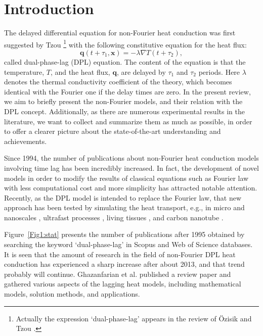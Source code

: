 \documentclass[sn-mathphys]{sn-jnl}%
\theoremstyle{thmstyleone}%
\theoremstyle{thmstyletwo}%
\theoremstyle{thmstylethree}%
\begin{document}
\section{Introduction}
{{ 
		The delayed differential equation for non-Fourier heat conduction was first suggested by Tzou \cite{Tzo95a,Tzou1995,Tzou1995p2,Tzo97b,Tzou2010,Tzoubook}\footnote{Actually the expression `dual-phase-lag' appears in the review of Özisik and Tzou \cite{OziTzu94a}.} with the following constitutive equation for the heat flux: 		
		\begin{equation}
			\mathbf{q}(t+\tau_1,\mathbf{x}) = -\lambda \nabla T(t+\tau_2),
			\label{dpl_eq}\end{equation}
			called dual-phase-lag (DPL) equation.
		The content of the equation is that the temperature, $T$, and the heat flux, $\mathbf{q}$, are delayed by $\tau_1$ and $\tau_2$ periods. Here $\lambda$ denotes the thermal conductivity coefficient of the theory, which becomes identical with the Fourier one if the delay times are zero. In the present review, we aim to briefly present the non-Fourier models, and their relation with the DPL concept. Additionally, as there are numerous experimental results in the literature, we want to collect and summarize them as much as possible, in order to offer a clearer picture about the state-of-the-art understanding and achievements. 

	
	Since 1994, the number of publications about non-Fourier heat conduction models involving time lag has been incredibly increased.  In fact, the development of novel models in order to modify the results of classical equations such as Fourier law with less computational cost and more simplicity has attracted notable attention. Recently, as the DPL model is intended to replace the Fourier law, that new approach has been tested by simulating the heat transport, e.g., in micro and nanoscales \cite{Vermeersch2008}, ultrafast processes \cite{Tzou2001,Chou2009}, living tissues \cite{Zhou2009}, and carbon nanotube \cite{Shiomi2006}.}
	 Figure~\ref{Fig1:stat} presents the number of publications after 1995 obtained by searching the keyword `dual-phase-lag' in Scopus and Web of Science databases. It is seen that the amount of research in the field of non-Fourier DPL heat conduction has experienced a sharp increase after about 2013, and that trend probably will continue. Ghazanfarian et al. \cite{Shomali2015} published a review paper and gathered various aspects of the lagging heat models, including mathematical models, solution methods, and applications.
	
}
\end{document}
